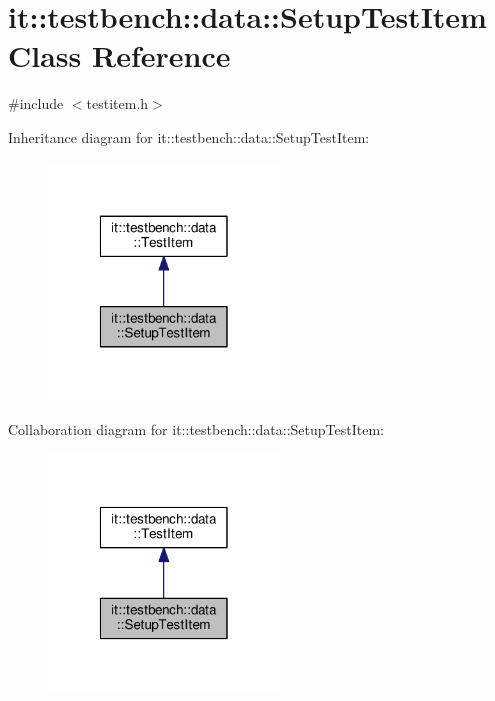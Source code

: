 \hypertarget{classit_1_1testbench_1_1data_1_1SetupTestItem}{\section{it\-:\-:testbench\-:\-:data\-:\-:Setup\-Test\-Item Class Reference}
\label{df/ddd/classit_1_1testbench_1_1data_1_1SetupTestItem}
}


{\ttfamily \#include $<$testitem.\-h$>$}



Inheritance diagram for it\-:\-:testbench\-:\-:data\-:\-:Setup\-Test\-Item\-:
\nopagebreak
\begin{figure}[H]
\begin{center}
\leavevmode
\includegraphics[width=174pt]{d4/d34/classit_1_1testbench_1_1data_1_1SetupTestItem__inherit__graph}
\end{center}
\end{figure}


Collaboration diagram for it\-:\-:testbench\-:\-:data\-:\-:Setup\-Test\-Item\-:
\nopagebreak
\begin{figure}[H]
\begin{center}
\leavevmode
\includegraphics[width=174pt]{d5/d21/classit_1_1testbench_1_1data_1_1SetupTestItem__coll__graph}
\end{center}
\end{figure}
